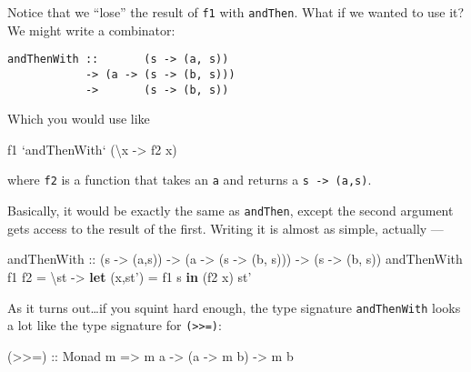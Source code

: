 \documentclass[]{article}
\newenvironment{Shaded}{}{}
\newcommand{\KeywordTok}[1]{\textcolor[rgb]{0.00,0.44,0.13}{\textbf{{#1}}}}
\newcommand{\DataTypeTok}[1]{\textcolor[rgb]{0.56,0.13,0.00}{{#1}}}
\newcommand{\OtherTok}[1]{\textcolor[rgb]{0.00,0.44,0.13}{{#1}}}
\newcommand{\FunctionTok}[1]{\textcolor[rgb]{0.02,0.16,0.49}{{#1}}}
\newcommand{\NormalTok}[1]{{#1}}
\begin{document}
Notice that we ``lose'' the result of \texttt{f1} with \texttt{andThen}. What if
we wanted to use it? We might write a combinator:

\begin{verbatim}
andThenWith ::       (s -> (a, s))
            -> (a -> (s -> (b, s)))
            ->       (s -> (b, s))
\end{verbatim}

Which you would use like

\begin{Shaded}
\begin{Highlighting}[]
\NormalTok{f1 }\OtherTok{`andThenWith`} \NormalTok{(\textbackslash{}x }\OtherTok{->} \NormalTok{f2 x)}
\end{Highlighting}
\end{Shaded}

where \texttt{f2} is a function that takes an \texttt{a} and returns a
\texttt{s\ -\textgreater{}\ (a,s)}.

Basically, it would be exactly the same as \texttt{andThen}, except the second
argument gets access to the result of the first. Writing it is almost as simple,
actually ---

\begin{Shaded}
\begin{Highlighting}[]
\OtherTok{andThenWith ::} \NormalTok{(s }\OtherTok{->} \NormalTok{(a,s)) }\OtherTok{->} \NormalTok{(a }\OtherTok{->} \NormalTok{(s }\OtherTok{->} \NormalTok{(b, s))) }\OtherTok{->} \NormalTok{(s }\OtherTok{->} \NormalTok{(b, s))}
\NormalTok{andThenWith f1 f2 }\FunctionTok{=} \NormalTok{\textbackslash{}st }\OtherTok{->} \KeywordTok{let} \NormalTok{(x,st') }\FunctionTok{=} \NormalTok{f1 s}
                           \KeywordTok{in}  \NormalTok{(f2 x) st'}
\end{Highlighting}
\end{Shaded}

As it turns out\ldots{}if you squint hard enough, the type signature
\texttt{andThenWith} looks a lot like the type signature for
\texttt{(\textgreater{}\textgreater{}=)}:

\begin{Shaded}
\begin{Highlighting}[]
\OtherTok{(>>=) ::} \DataTypeTok{Monad} \NormalTok{m }\OtherTok{=>} \NormalTok{m a }\OtherTok{->} \NormalTok{(a }\OtherTok{->} \NormalTok{m b) }\OtherTok{->} \NormalTok{m b}
\end{Highlighting}
\end{Shaded}
\end{document}
